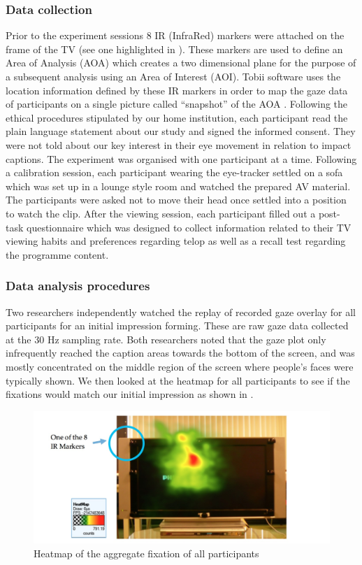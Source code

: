 \documentclass[output=paper]{langsci/langscibook}
\begin{document}
\subsubsection{Data collection}

Prior to the experiment sessions 8 IR (InfraRed) markers were attached on the frame of the TV (see one highlighted in ). These markers are used to define an Area of Analysis (AOA) which creates a two dimensional plane for the purpose of a subsequent analysis using an Area of Interest (AOI).  Tobii software uses the location information defined by these IR markers in order to map the gaze data of participants on a single picture called ``snapshot'' of the AOA \citep{Tobii2012}. Following the ethical procedures stipulated by our home institution, each participant read the plain language statement about our study and signed the informed consent. They were not told about our key interest in their eye movement in relation to impact captions. The experiment was organised with one participant at a time. Following a calibration session, each participant wearing the eye-tracker settled on a sofa which was set up in a lounge style room and watched the prepared AV material.  The participants were asked not to move their head once settled into a position to watch the clip. After the viewing session, each participant filled out a post-task questionnaire which was designed to collect information related to their TV viewing habits and preferences regarding telop as well as a recall test regarding the programme content.  

\subsubsection{Data analysis procedures}

Two researchers independently watched the replay of recorded gaze overlay for all participants for an initial impression forming.  These are raw gaze data collected at the 30 Hz sampling rate.  Both researchers noted that the gaze plot only infrequently reached the caption areas towards the bottom of the screen, and was mostly concentrated on the middle region of the screen where people's faces were typically shown. We then looked at the heatmap for all participants to see if the fixations would match our initial impression as shown in . 

\begin{figure}
 \includegraphics[width=\textwidth]{figures/OHagan2.png}
 \caption{Heatmap of the aggregate fixation of all participants}
 \label{ohagan:fig:2}
\end{figure}
\end{document}
